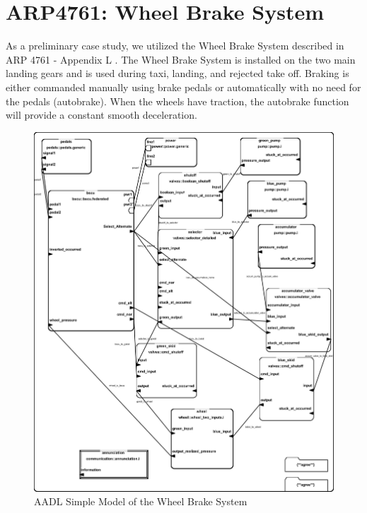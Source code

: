 \section{ARP4761: Wheel Brake System}


As a preliminary case study, we utilized the Wheel Brake System described in ARP 4761 - Appendix L \cite{AIR6110}. The Wheel Brake System is installed on the two main landing gears and is used during taxi, landing, and rejected take off. Braking is either commanded manually using brake pedals or automatically with no need for the pedals (autobrake). When the wheels have traction, the autobrake function will provide a constant smooth deceleration.


\begin{figure}
\begin{center}
\includegraphics[width=\textwidth]{images/wbsfederated3.jpg}
\caption{AADL Simple Model of the Wheel Brake System }
\label{fig:wbs_ima}
\end{center}
\end{figure}

